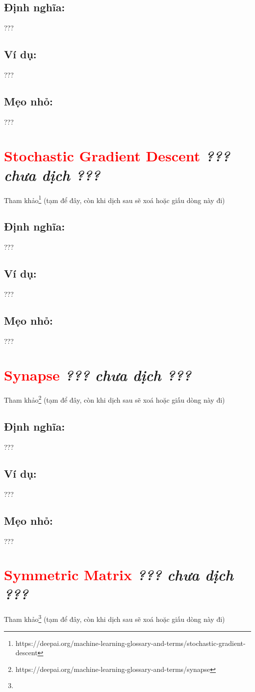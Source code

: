 \subsection*{Định nghĩa:}
???
\subsection*{Ví dụ:}
???
\subsection*{Mẹo nhỏ:}
???
\section*{\huge \textcolor{Red}{Stochastic Gradient Descent}  \small \textit{??? chưa dịch ???} }
Tham khảo\footnote{https://deepai.org/machine-learning-glossary-and-terms/stochastic-gradient-descent} (tạm để đây, còn khi dịch sau sẽ xoá hoặc giấu dòng này đi)
\subsection*{Định nghĩa:}
???
\subsection*{Ví dụ:}
???
\subsection*{Mẹo nhỏ:}
???
\section*{\huge \textcolor{Red}{Synapse}  \small \textit{??? chưa dịch ???} }
Tham khảo\footnote{https://deepai.org/machine-learning-glossary-and-terms/synapse} (tạm để đây, còn khi dịch sau sẽ xoá hoặc giấu dòng này đi)
\subsection*{Định nghĩa:}
???
\subsection*{Ví dụ:}
???
\subsection*{Mẹo nhỏ:}
???
\section*{\huge \textcolor{Red}{Symmetric Matrix}  \small \textit{??? chưa dịch ???} }
Tham khảo\footnote{} (tạm để đây, còn khi dịch sau sẽ xoá hoặc giấu dòng này đi)
